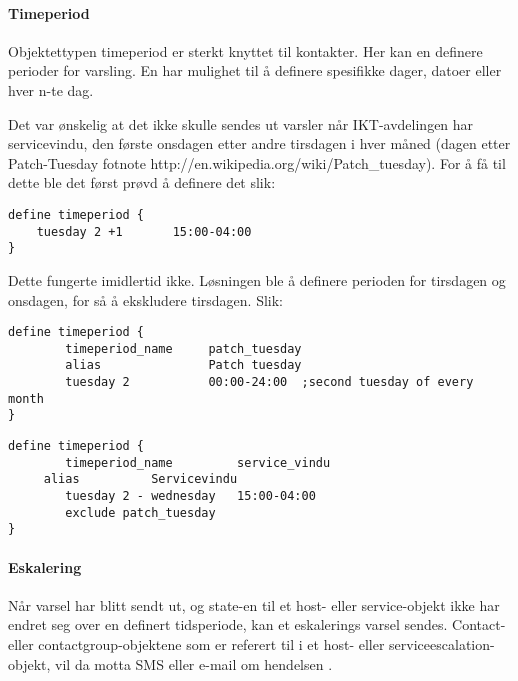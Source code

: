 \paragraph{Timeperiod}

Objektettypen timeperiod er sterkt knyttet til kontakter. Her kan en definere perioder for varsling. En har mulighet til å definere spesifikke dager, datoer eller hver n-te dag. 

Det var ønskelig at det ikke skulle sendes ut varsler når IKT-avdelingen har servicevindu, den første onsdagen etter andre tirsdagen i hver måned (dagen etter Patch-Tuesday fotnote http://en.wikipedia.org/wiki/Patch\_tuesday). For å få til dette ble det først prøvd å definere det slik:

\begin{lstlisting}
define timeperiod {
	tuesday 2 +1       15:00-04:00
}
\end{lstlisting}

Dette fungerte imidlertid ikke. Løsningen ble å definere perioden for tirsdagen og onsdagen, for så å ekskludere tirsdagen. Slik:
\begin{lstlisting}
define timeperiod {
        timeperiod_name 	patch_tuesday
        alias           	Patch tuesday
        tuesday 2          	00:00-24:00  ;second tuesday of every month
}
\end{lstlisting}

\begin{lstlisting}
define timeperiod {
        timeperiod_name         service_vindu
	 alias			Servicevindu
        tuesday 2 - wednesday   15:00-04:00
        exclude patch_tuesday
}
\end{lstlisting}

\paragraph{Eskalering}

Når varsel har blitt sendt ut, og state-en til et host- eller service-objekt ikke har endret seg over en definert tidsperiode, kan et eskalerings varsel sendes. Contact- eller contactgroup-objektene som er referert til i et host- eller serviceescalation-objekt, vil da motta SMS eller e-mail om hendelsen .

